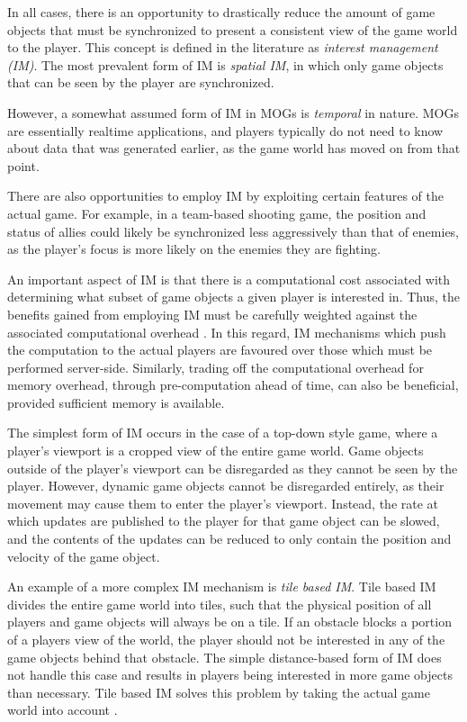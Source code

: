 In all cases, there is an opportunity to drastically reduce the amount of game objects that must be synchronized to present a consistent view of the game world to the player. This concept is defined in the literature as \textit{interest management (IM)}. The most prevalent form of IM is \textit{spatial IM}, in which only game objects that can be seen by the player are synchronized.

However, a somewhat assumed form of IM in MOGs is \textit{temporal} in nature. MOGs are essentially realtime applications, and players typically do not need to know about data that was generated earlier, as the game world has moved on from that point. 

There are also opportunities to employ IM by exploiting certain features of the actual game. For example, in a team-based shooting game, the position and status of allies could likely be synchronized less aggressively than that of enemies, as the player's focus is more likely on the enemies they are fighting.

An important aspect of IM is that there is a computational cost associated with determining what subset of game objects a given player is interested in. Thus, the benefits gained from employing IM must be carefully weighted against the associated computational overhead \cite{im-thesis}. 
In this regard, IM mechanisms which push the computation to the actual players are favoured over those which must be performed server-side. Similarly, trading off the computational overhead for memory overhead, through pre-computation ahead of time, can also be beneficial, provided sufficient memory is available.

The simplest form of IM occurs in the case of a top-down style game, where a player's viewport is a cropped view of the entire game world. Game objects outside of the player's viewport can be disregarded as they cannot be seen by the player. However, dynamic game objects  cannot be disregarded entirely, as their movement may cause them to enter the player's viewport. Instead, the rate at which updates are published to the player for that game object can be slowed, and the contents of the updates can be reduced to only contain the position and velocity of the game object.

An example of a more complex IM mechanism is \textit{tile based IM}. Tile based IM divides the entire game world into tiles, such that the physical position of all players and game objects will always be on a tile. If an obstacle blocks a portion of a players view of the world, the player should not be interested in any of the game objects behind that obstacle. The simple distance-based form of IM does not handle this case and results in players being interested in more game objects than necessary. Tile based IM solves this problem by taking the actual game world into account \cite{pub-sub-mog}.

